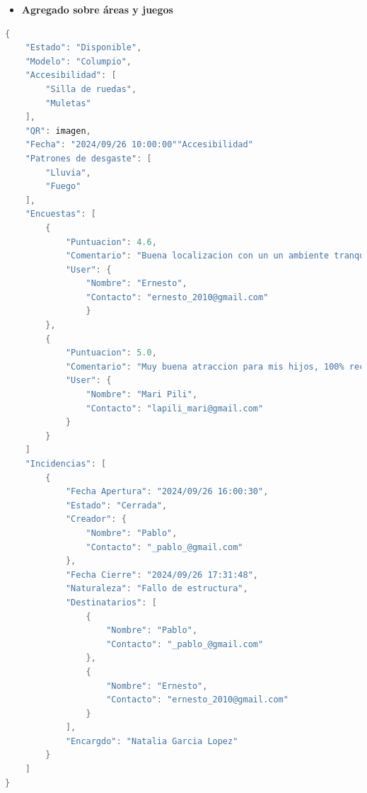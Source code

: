 \documentclass[]{article}
\begin{document}
\begin{itemize}
    \item \textbf{Agregado sobre áreas y juegos}
\end{itemize}
\begin{lstlisting}[caption=Ejemplo de JSON para Agregado sobre Indicencias y Encuestas, language=C]
{
    "Estado": "Disponible",
    "Modelo": "Columpio",
    "Accesibilidad": [
        "Silla de ruedas",
        "Muletas"
    ],
    "QR": imagen,
    "Fecha": "2024/09/26 10:00:00""Accesibilidad"
    "Patrones de desgaste": [
        "Lluvia",
        "Fuego"
    ],
    "Encuestas": [
        {
            "Puntuacion": 4.6,
            "Comentario": "Buena localizacion con un un ambiente tranquilo",
            "User": {
                "Nombre": "Ernesto",
                "Contacto": "ernesto_2010@gmail.com"
                }
        },
        {
            "Puntuacion": 5.0,
            "Comentario": "Muy buena atraccion para mis hijos, 100% recomendado",
            "User": {
                "Nombre": "Mari Pili",
                "Contacto": "lapili_mari@gmail.com"
            }
        }
    ]
    "Incidencias": [
        {
            "Fecha Apertura": "2024/09/26 16:00:30",
            "Estado": "Cerrada",
            "Creador": {
                "Nombre": "Pablo",
                "Contacto": "_pablo_@gmail.com"
            },
            "Fecha Cierre": "2024/09/26 17:31:48",
            "Naturaleza": "Fallo de estructura",
            "Destinatarios": [
                {
                    "Nombre": "Pablo",
                    "Contacto": "_pablo_@gmail.com"
                },
                {
                    "Nombre": "Ernesto",
                    "Contacto": "ernesto_2010@gmail.com"
                }
            ],
            "Encargdo": "Natalia Garcia Lopez"
        }
    ]
}
\end{lstlisting}

\newpage
\end{document}
